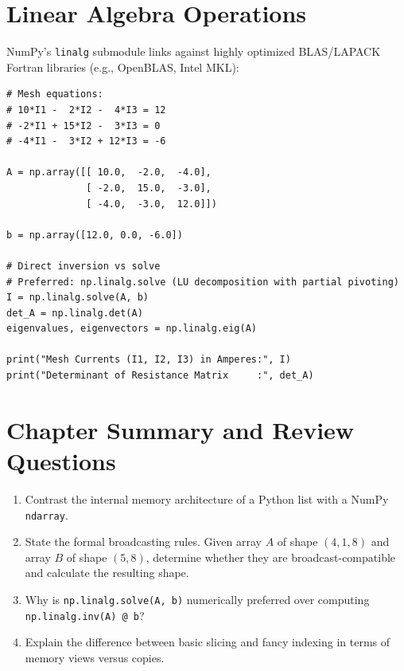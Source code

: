 \section{Linear Algebra Operations}

NumPy's \texttt{linalg} submodule links against highly optimized BLAS/LAPACK Fortran libraries (e.g., OpenBLAS, Intel MKL):

\begin{lstlisting}[caption={Solving Linear Systems $A x = b$ in Circuit Analysis}]
# Mesh equations:
# 10*I1 -  2*I2 -  4*I3 = 12
# -2*I1 + 15*I2 -  3*I3 = 0
# -4*I1 -  3*I2 + 12*I3 = -6

A = np.array([[ 10.0,  -2.0,  -4.0],
              [ -2.0,  15.0,  -3.0],
              [ -4.0,  -3.0,  12.0]])

b = np.array([12.0, 0.0, -6.0])

# Direct inversion vs solve
# Preferred: np.linalg.solve (LU decomposition with partial pivoting)
I = np.linalg.solve(A, b)
det_A = np.linalg.det(A)
eigenvalues, eigenvectors = np.linalg.eig(A)

print("Mesh Currents (I1, I2, I3) in Amperes:", I)
print("Determinant of Resistance Matrix     :", det_A)
\end{lstlisting}

\section{Chapter Summary and Review Questions}
\begin{enumerate}[leftmargin=1.8em, itemsep=4pt]
    \item Contrast the internal memory architecture of a Python list with a NumPy \texttt{ndarray}.
    \item State the formal broadcasting rules. Given array $A$ of shape $(4, 1, 8)$ and array $B$ of shape $(5, 8)$, determine whether they are broadcast-compatible and calculate the resulting shape.
    \item Why is \texttt{np.linalg.solve(A, b)} numerically preferred over computing \texttt{np.linalg.inv(A) @ b}?
    \item Explain the difference between basic slicing and fancy indexing in terms of memory views versus copies.
\end{enumerate}

